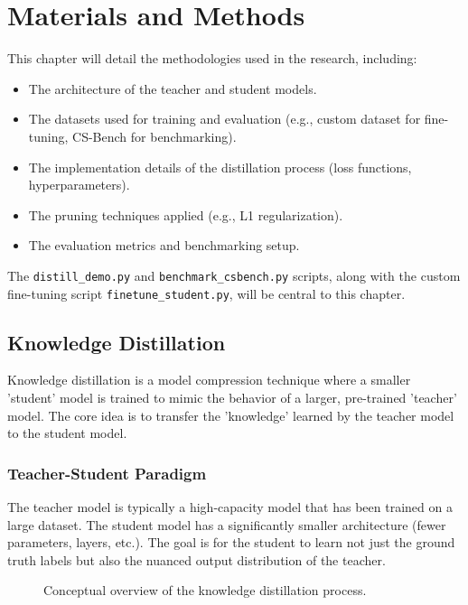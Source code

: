 \documentclass[12pt, a4paper]{report}
\begin{document}
\chapter{Materials and Methods}
\label{chap:methods}
This chapter will detail the methodologies used in the research, including:
\begin{itemize}
    \item The architecture of the teacher and student models.
    \item The datasets used for training and evaluation (e.g., custom dataset for fine-tuning, CS-Bench for benchmarking).
    \item The implementation details of the distillation process (loss functions, hyperparameters).
    \item The pruning techniques applied (e.g., L1 regularization).
    \item The evaluation metrics and benchmarking setup.
\end{itemize}
The \texttt{distill\_demo.py} and \texttt{benchmark\_csbench.py} scripts, along with the custom fine-tuning script \texttt{finetune\_student.py}, will be central to this chapter.

\section{Knowledge Distillation}
\label{sec:knowledge_distillation_methods}
Knowledge distillation is a model compression technique where a smaller 'student' model is trained to mimic the behavior of a larger, pre-trained 'teacher' model. The core idea is to transfer the 'knowledge' learned by the teacher model to the student model.

\subsection{Teacher-Student Paradigm}
The teacher model is typically a high-capacity model that has been trained on a large dataset. The student model has a significantly smaller architecture (fewer parameters, layers, etc.). The goal is for the student to learn not just the ground truth labels but also the nuanced output distribution of the teacher.

\begin{figure}[h!]
\centering
\caption{Conceptual overview of the knowledge distillation process.}
\label{fig:teacher_student}
\end{figure}
\end{document}
